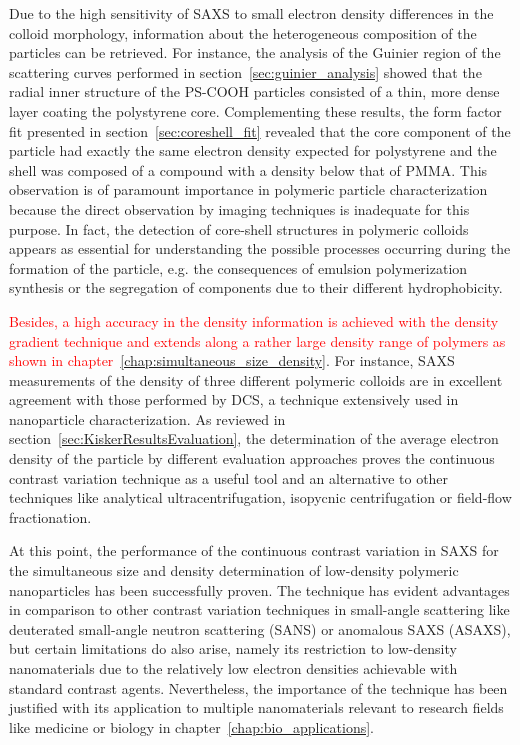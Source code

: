 Due to the high sensitivity of SAXS to small electron density differences in the colloid morphology, information about the heterogeneous composition of the particles can be retrieved. For instance, the analysis of the Guinier region of the scattering curves performed in section~\ref{sec:guinier_analysis} showed that the radial inner structure of the PS-COOH particles consisted of a thin, more dense layer coating the polystyrene core. Complementing these results, the form factor fit presented in section~\ref{sec:coreshell_fit} revealed that the core component of the particle had exactly the same electron  density expected for polystyrene and the shell was composed of a compound with a density below that of PMMA. This observation is of paramount importance in polymeric particle characterization because the direct observation by imaging techniques is inadequate for this purpose. In fact, the detection of core-shell structures in polymeric colloids appears as essential for understanding the possible processes occurring during the formation of the particle, e.g. the consequences of emulsion polymerization synthesis or the segregation of components due to their different hydrophobicity.

\textcolor{red}{Besides, a high accuracy in the density information is achieved with the density gradient technique and extends along a rather large density range of polymers as shown in chapter~\ref{chap:simultaneous_size_density}}. For instance, SAXS measurements of the density of three different polymeric colloids are in excellent agreement with those performed by DCS, a technique extensively used in nanoparticle characterization. As reviewed in section~\ref{sec:KiskerResultsEvaluation}, the determination of the average electron density of the particle by different evaluation approaches proves the continuous contrast variation technique as a useful tool and an alternative to other techniques like analytical ultracentrifugation, isopycnic centrifugation or field-flow fractionation.

At this point, the performance of the continuous contrast variation in SAXS for the simultaneous size and density determination of low-density polymeric nanoparticles has been successfully proven. The technique has evident advantages in comparison to other contrast variation techniques in small-angle scattering like deuterated small-angle neutron scattering (SANS) or anomalous SAXS (ASAXS), but certain limitations do also arise, namely its restriction to low-density nanomaterials due to the relatively low electron densities achievable with standard contrast agents. Nevertheless, the importance of the technique has been justified with its application to multiple nanomaterials relevant to research fields like medicine or biology in chapter~\ref{chap:bio_applications}.

